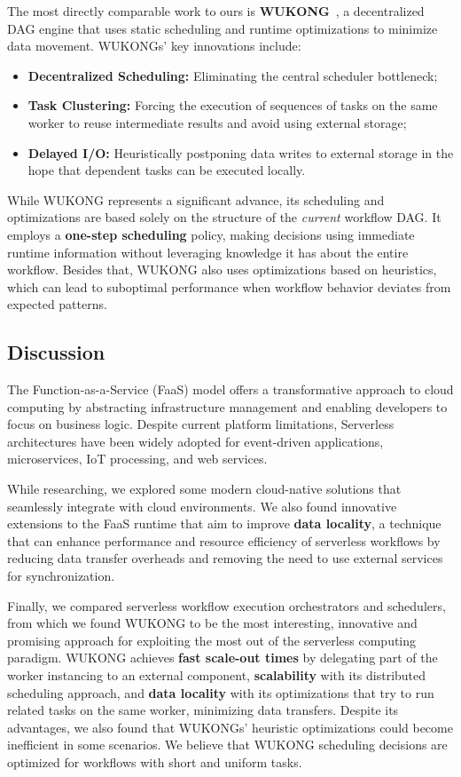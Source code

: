 \documentclass[conference]{IEEEtran}
\begin{document}
The most directly comparable work to ours is \textbf{WUKONG}~\cite{wukong_2}, a decentralized DAG engine that uses static scheduling and runtime optimizations to minimize data movement. WUKONGs' key innovations include:
\begin{itemize}
    \item \textbf{Decentralized Scheduling:} Eliminating the central scheduler bottleneck;
    \item \textbf{Task Clustering:} Forcing the execution of sequences of tasks on the same worker to reuse intermediate results and avoid using external storage;
    \item \textbf{Delayed I/O:} Heuristically postponing data writes to external storage in the hope that dependent tasks can be executed locally.
\end{itemize}

While WUKONG represents a significant advance, its scheduling and optimizations are based solely on the structure of the \textit{current} workflow DAG. It employs a \textbf{one-step scheduling} policy, making decisions using immediate runtime information without leveraging knowledge it has about the entire workflow. Besides that, WUKONG also uses optimizations based on heuristics, which can lead to suboptimal performance when workflow behavior deviates from expected patterns.

\subsection{Discussion}
The Function-as-a-Service (FaaS) model offers a transformative approach to cloud computing by abstracting infrastructure management and enabling developers to focus on business logic. Despite current platform limitations, Serverless architectures have been widely adopted for event-driven applications, microservices, IoT processing, and web services.

While researching, we explored some modern cloud-native solutions that seamlessly integrate with cloud environments. We also found innovative extensions to the FaaS runtime that aim to improve \textbf{data locality}, a technique that can enhance performance and resource efficiency of serverless workflows by reducing data transfer overheads and removing the need to use external services for synchronization.

Finally, we compared serverless workflow execution orchestrators and schedulers, from which we found WUKONG to be the most interesting, innovative and promising approach for exploiting the most out of the serverless computing paradigm. WUKONG achieves \textbf{fast scale-out times} by delegating part of the worker instancing to an external component, \textbf{scalability} with its distributed scheduling approach, and \textbf{data locality} with its optimizations that try to run related tasks on the same worker, minimizing data transfers. Despite its advantages, we also found that WUKONGs' heuristic optimizations could become inefficient in some scenarios. We believe that WUKONG scheduling decisions are optimized for workflows with short and uniform tasks.
\end{document}
